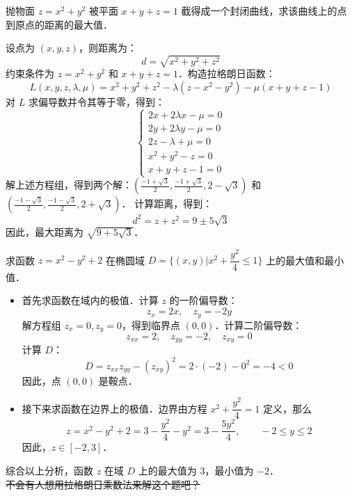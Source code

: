\documentclass[12pt, a4paper, oneside, UTF8]{ctexbook}
\begin{document}
\begin{example}
    抛物面 $z = x^2 + y^2$ 被平面 $x + y + z = 1$ 截得成一个封闭曲线，求该曲线上的点到原点的距离的最大值．
\end{example}
\begin{solution}
    设点为 $(x,y,z)$，则距离为：
    \[ d = \sqrt{x^2 + y^2 + z^2} \]
    约束条件为 $z = x^2 + y^2$ 和 $x + y + z = 1$．构造拉格朗日函数：
    \[ L(x,y,z,\lambda,\mu) = x^2 + y^2 + z^2 - \lambda (z - x^2 - y^2) - \mu (x + y + z - 1) \]
    对 $L$ 求偏导数并令其等于零，得到：
    \[
    \begin{cases}
        2x + 2\lambda x - \mu = 0 \\
        2y + 2\lambda y - \mu = 0 \\
        2z - \lambda + \mu = 0 \\
        x^2 + y^2 - z = 0 \\
        x + y + z - 1 = 0
    \end{cases}
    \]
    解上述方程组，得到两个解：$(\frac{-1+\sqrt{3}}{2}, \frac{-1+\sqrt{3}}{2}, 2-\sqrt{3})$ 和 $(\frac{-1-\sqrt{3}}{2}, \frac{-1-\sqrt{3}}{2}, 2+\sqrt{3})$．
    计算距离，得到：
    \[ d^2 = z + z^2 = 9 \pm 5\sqrt{3} \]
    因此，最大距离为 $\boxed{\sqrt{9 + 5\sqrt{3}}}$．
\end{solution}
\begin{example}
    求函数 $z=x^2-y^2+2$ 在椭圆域 $D=\{(x,y)|x^2+\dfrac{y^2}{4}\le 1\}$ 上的最大值和最小值．
\end{example}
\begin{solution}
    \begin{itemize}
        \item 首先求函数在域内的极值．计算 $z$ 的一阶偏导数：
        \[ z_x = 2x, \quad z_y = -2y \]
        解方程组 $z_x = 0, z_y = 0$，得到临界点 $(0,0)$．计算二阶偏导数：
        \[ z_{xx} = 2, \quad z_{yy} = -2, \quad z_{xy} = 0 \]
        计算 $D$：
        \[ D = z_{xx}z_{yy} - (z_{xy})^2 = 2 \cdot (-2) - 0^2 = -4 < 0 \]
        因此，点 $(0,0)$ 是鞍点．
        \item 接下来求函数在边界上的极值．边界由方程 $x^2 + \dfrac{y^2}{4} = 1$ 定义，那么
        \[z=x^2 - y^2 + 2 = 3 - \frac{y^2}{4} - y^2 = 3 - \frac{5y^2}{4},\qquad -2 \leq y \leq 2\]
        因此，$z \in [-2,3]$．
    \end{itemize}
    综合以上分析，函数 $z$ 在域 $D$ 上的最大值为 $\boxed{3}$，最小值为 $\boxed{-2}$．\\
    \sout{不会有人想用拉格朗日乘数法来解这个题吧？}
\end{solution}
\end{document}
